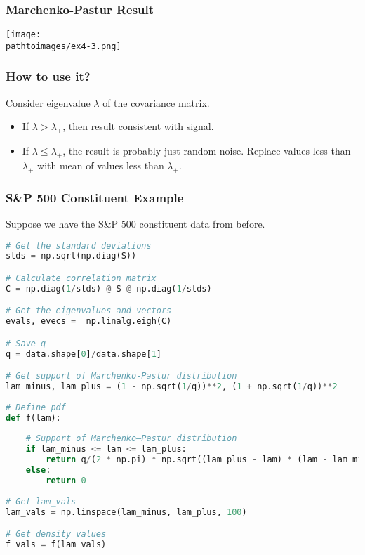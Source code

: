 \documentclass{beamer}
\newcommand{\pathtoimages}{/Users/charlesrambo/Desktop/Bootcamp24/Images}
\begin{document}
\begin{frame}[fragile]
\frametitle{Marchenko-Pastur Result}

\begin{center}
\texttt{[image: \\pathtoimages/ex4-3.png]}
\end{center}

\end{frame}

\begin{frame}
\frametitle{How to use it?}
Consider eigenvalue $\lambda$ of the covariance matrix.
\begin{itemize}
\item If $\lambda > \lambda_+$, then result consistent with signal. 
\item If $\lambda \leq \lambda_+$, the result is probably just random noise. Replace values less than $\lambda_+$ with mean of values less than $\lambda_+$.
\end{itemize}

\end{frame}

\begin{frame}[fragile]
\frametitle{S\&P 500 Constituent Example}
Suppose we have the S\&P 500 constituent data from before.
\begin{lstlisting}[language=Python]
# Get the standard deviations
stds = np.sqrt(np.diag(S))

# Calculate correlation matrix
C = np.diag(1/stds) @ S @ np.diag(1/stds)

# Get the eigenvalues and vectors
evals, evecs =  np.linalg.eigh(C)

# Save q
q = data.shape[0]/data.shape[1]

# Get support of Marchenko-Pastur distribution
lam_minus, lam_plus = (1 - np.sqrt(1/q))**2, (1 + np.sqrt(1/q))**2 
        
# Define pdf
def f(lam):
    
    # Support of Marchenko–Pastur distribution
    if lam_minus <= lam <= lam_plus:  
        return q/(2 * np.pi) * np.sqrt((lam_plus - lam) * (lam - lam_minus))/lam                
    else:       
        return 0
    
# Get lam_vals
lam_vals = np.linspace(lam_minus, lam_plus, 100)

# Get density values
f_vals = f(lam_vals)
\end{lstlisting}
\end{frame}
\end{document}
